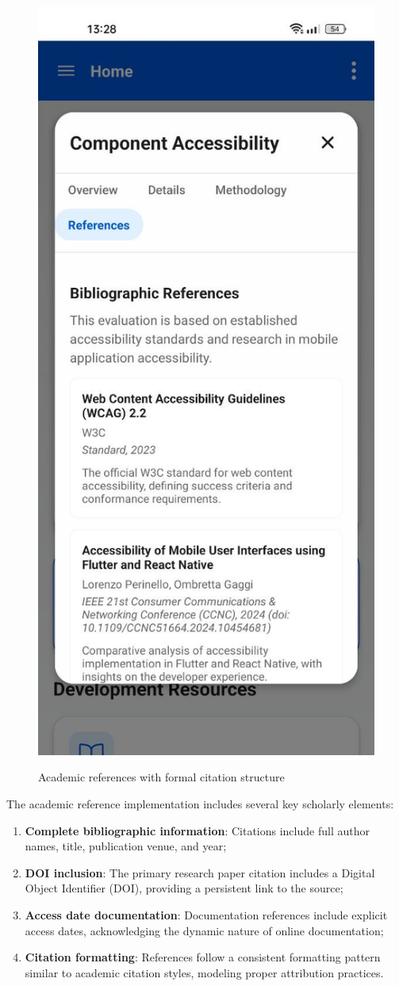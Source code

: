 \begin{figure}[ht]
    \centering
    \includegraphics[width=0.4\linewidth, alt={Academic references with complete citation information}]{img/references.jpg}
    \caption{Academic references with formal citation structure}
    \label{fig:academic_citation_detail}
\end{figure}

The academic reference implementation includes several key scholarly elements:

\begin{enumerate}
    \item \textbf{Complete bibliographic information}: Citations include full author names, title, publication venue, and year;
    
    \item \textbf{DOI inclusion}: The primary research paper citation includes a Digital Object Identifier (DOI), providing a persistent link to the source;
    
    \item \textbf{Access date documentation}: Documentation references include explicit access dates, acknowledging the dynamic nature of online documentation;
    
    \item \textbf{Citation formatting}: References follow a consistent formatting pattern similar to academic citation styles, modeling proper attribution practices.
\end{enumerate}

